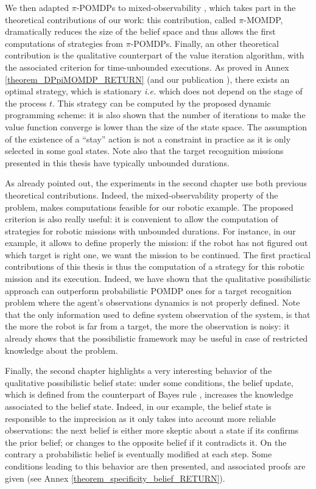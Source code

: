 We then adapted $\pi$-POMDPs 
to mixed-observability \cite{OngShaoHsuWee-IJRR10},
which takes part in the theoretical contributions of our work:
this contribution, called $\pi$-MOMDP, 
dramatically reduces the size of the belief space 
and thus allows the first computations of strategies from $\pi$-POMDPs. 
Finally, an other theoretical contribution 
is the qualitative counterpart 
of the value iteration algorithm,
with the associated criterion 
for time-unbounded executions. 
As proved in Annex \ref{theorem_DPpiMOMDP_RETURN}
(and our publication \cite{Drougard13}), 
there exists an optimal strategy, 
which is stationary 
\textit{i.e.} which does not depend on the stage of the process $t$. 
This strategy can be computed 
by the proposed dynamic programming scheme: 
it is also shown that 
the number of iterations 
to make the value function converge 
is lower than the size of the state space.
The assumption of the existence of a ``stay'' action
is not a constraint in practice
as it is only selected 
in some goal states.
Note also that the target recognition missions 
presented in this thesis 
have typically unbounded durations.

As already pointed out,
the experiments in the second chapter 
use both previous theoretical contributions.
Indeed, the mixed-observability property of the problem,
makes computations feasible for our robotic example.
The proposed criterion is also really useful: 
it is convenient to allow 
the computation of strategies 
for robotic missions 
with unbounded durations.
For instance, in our example, 
it allows to define properly the mission: 
if the robot has not figured out 
which target is right one,
we want the mission to be continued.
The first practical contributions of this thesis 
is thus the computation of a strategy
for this robotic mission and its execution.
Indeed, we have shown 
that the qualitative possibilistic approach 
can outperform probabilistic POMDP ones 
for a target recognition problem 
where the agent's observations dynamics 
is not properly defined.
Note that the only information used 
to define system observation of the system,
is that the more the robot is far from a target, 
the more the observation is noisy:
it already shows that the possibilistic framework
may be useful in case of restricted knowledge 
about the problem.


Finally, the second chapter highlights 
a very interesting behavior 
of the qualitative possibilistic belief state:
under some conditions, 
the belief update, 
which is defined from the counterpart of Bayes rule \cite{Dubois199023},
increases the knowledge associated to the belief state.
Indeed, in our example, 
the belief state is responsible to the imprecision 
as it only takes into account 
more reliable observations:
the next belief is either more skeptic 
about a state if its confirms the prior belief; 
or changes to the opposite belief if it contradicts it.
On the contrary a probabilistic belief 
is eventually modified at each step. 
Some conditions leading to this behavior 
are then presented,
and associated proofs are given 
(see Annex \ref{theorem_specificity_belief_RETURN}).

